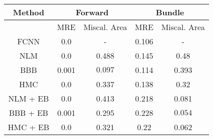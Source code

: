 \documentclass[convert={outext=.png}]{standalone}
\begin{document}
\begin{tabular}{c c c c c}
\hline
\hline
Method &  \multicolumn{2}{c}{Forward} & \multicolumn{2}{c}{Bundle} \\ \hline
 & MRE & Miscal. Area & MRE & Miscal. Area \\
 FCNN & 0.0 & - & 0.106 & - \\
 \hline
 NLM & 0.0 & 0.488 & 0.145 & 0.48 \\
 BBB & 0.001 & $\mathbf{0.097}$ & 0.114 & 0.393 \\
 HMC & 0.0 & 0.337 & 0.138 & 0.32 \\
 \hline
 NLM + EB & 0.0 & 0.413 & 0.218 & 0.081 \\
 BBB + EB & 0.001 & 0.295 & 0.228 & $\mathbf{0.054}$ \\
 HMC + EB & 0.0 & 0.321 & 0.22 & 0.062 \\
\hline
\hline
\end{tabular}
\end{document}
